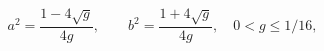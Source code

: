\begin{equation}
    a^2=\frac{1-4\sqrt g}{4g},\qquad b^2=\frac{1+4\sqrt g}{4g},
    \quad 0<g\leq 1/16,
\end{equation}

